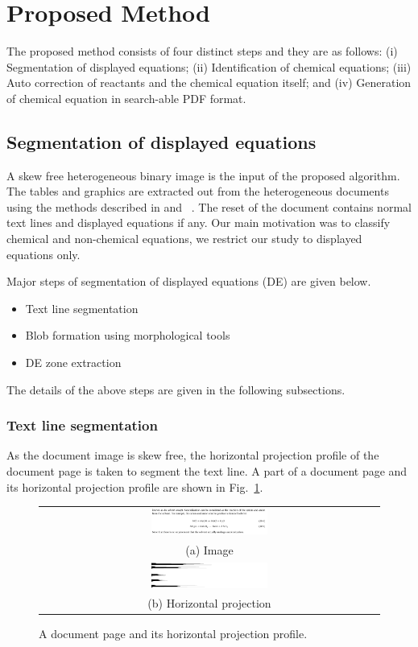 \documentclass[conference]{IEEEtran}
\begin{document}
\section{Proposed Method}
\label{proposed_algo}
The proposed method consists of four distinct steps and they are as follows:
(i) Segmentation of  displayed equations; (ii) Identification of chemical equations; (iii) Auto correction of reactants and the chemical equation itself; and
(iv) Generation of chemical equation in search-able PDF format.
\subsection{Segmentation of displayed equations}
A skew free heterogeneous binary image is the input of the proposed algorithm. The tables and graphics are  extracted out from the heterogeneous documents using the methods described in \cite{sekhar_06} and ~\cite{spc_07}. The reset of the document contains normal text lines and displayed equations if any. Our main motivation was to classify chemical and non-chemical equations, we restrict our study to displayed  equations only.

Major steps of segmentation of displayed equations (DE) are given below.
 \begin{itemize}
 \item Text line segmentation
 \item Blob formation using morphological tools
 \item DE zone extraction
 \end{itemize}
The details of the above steps are given in the following subsections.
\subsubsection{Text line segmentation}
As the document image is skew free, the horizontal projection profile of the document page is taken  to segment the text line. A part of a document page and its horizontal projection profile are shown in Fig.~\ref{H_PROJ}.
\begin{figure}[h]\center\footnotesize
\begin{tabular}{|c|}
\hline
 \includegraphics[width=0.35\textwidth]{simage.png} \\
 (a) Image\\ \hline
 \includegraphics[width=0.35\textwidth]{hproj.png} \\
 (b) Horizontal projection \\ \hline
 \end{tabular} 
 \caption{ A document page and its horizontal projection profile.}
 \label{H_PROJ}
\end{figure}
\end{document}
